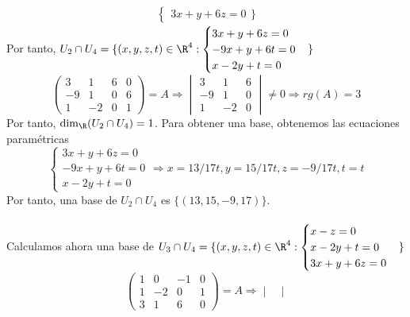 \begin{ejercicio}
\begin{enumerate}
\begin{align*}
\begin{cases}
					                               3x + y + 6z = 0
				                               \end{cases}\}
			\end{align*}
			Por tanto, $U_2 \cap U_4 = \{(x,y,z,t) \in \R^4 : \begin{cases}
					3x + y + 6z = 0  \\
					-9x + y + 6t = 0 \\
					x - 2y + t = 0
				\end{cases}\}$
			\begin{equation*}
				\begin{pmatrix}
					3  & 1  & 6 & 0 \\
					-9 & 1  & 0 & 6 \\
					1  & -2 & 0 & 1
				\end{pmatrix} = A \Rightarrow \begin{vmatrix}
					3  & 1  & 6 \\
					-9 & 1  & 0 \\
					1  & -2 & 0
				\end{vmatrix} \neq 0 \Rightarrow rg(A) = 3
			\end{equation*}
			Por tanto, $\dim_\R(U_2 \cap U_4) = 1$. Para obtener una base, obtenemos las ecuaciones paramétricas
			\begin{equation*}
				\begin{cases}
					3x + y + 6z = 0  \\
					-9x + y + 6t = 0 \\
					x - 2y + t = 0
				\end{cases} \Rightarrow x = 13/17t, y = 15/17t, z = -9/17t, t = t
			\end{equation*}
			Por tanto, una base de $U_2 \cap U_4$ es $\{(13, 15, -9, 17)\}$.
			\\ \\
			Calculamos ahora una base de $U_3 \cap U_4 = \{(x,y,z,t) \in \R^4 : \begin{cases}
					x - z = 0      \\
					x - 2y + t = 0 \\
					3x + y + 6z = 0
				\end{cases}\}$
			\begin{equation*}
				\begin{pmatrix}
					1 & 0  & -1 & 0 \\
					1 & -2 & 0  & 1 \\
					3 & 1  & 6  & 0
				\end{pmatrix} = A \Rightarrow \begin{vmatrix}

\end{vmatrix}
\end{equation*}
\end{enumerate}
\end{ejercicio}
